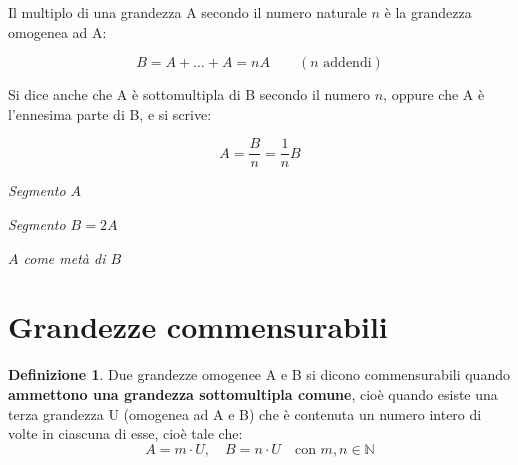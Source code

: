 \documentclass[a4paper,12pt]{article}
\theoremstyle{definition}
\newtheorem{defin}{Definizione}[section]
\theoremstyle{remark}
\begin{document}
Il multiplo di una grandezza A secondo il numero naturale \( n \) è la grandezza omogenea ad A:

\[
B = A + \ldots + A = nA \qquad (n \text{ addendi})
\]

Si dice anche che A è sottomultipla di B secondo il numero \( n \), oppure che A è l'ennesima parte
di B, e si scrive:

\[
A = \frac{B}{n} = \frac{1}{n} B
\]

\medskip
\begin{center}

\textit{Segmento $A$}
\end{center}

\begin{center}

\textit{Segmento $B = 2A$}
\end{center}

\begin{center}

\textit{$A$ come metà di $B$}
\end{center}

\section{Grandezze commensurabili}

\begin{defin}
Due grandezze omogenee A e B si dicono commensurabili quando \textbf{ammettono una grandezza sottomultipla comune}, cioè quando esiste una terza grandezza U (omogenea ad A e B) che è contenuta un numero intero di volte in ciascuna di esse, cioè tale che:
$$A = m \cdot U, \quad B = n \cdot U \quad \text{con } m, n \in \mathbb{N}$$
\end{defin}
\end{document}
